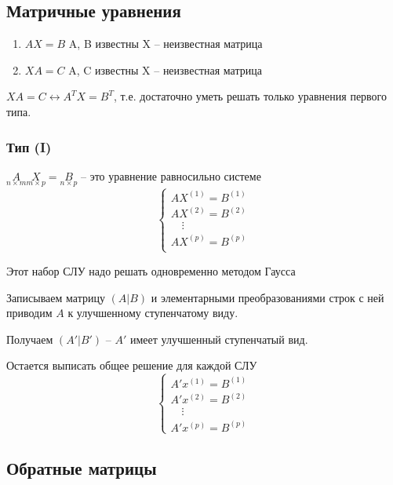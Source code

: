 \subsection{Матричные уравнения}

\begin{enumerate}
\item $AX = B$
    A, B известны
    X -- неизвестная матрица

\item $XA = C$
    A, C известны
    X -- неизвестная матрица
\end{enumerate}

$XA = C \leftrightarrow A^T X = B^T$, т.е. достаточно уметь решать только уравнения первого типа.

\subsubsection{Тип (I)}

$\underset{n \times m}{A} \underset{m \times p}{X} = \underset{n \times p}{B}$ -- это уравнение равносильно системе
\begin{equation*}
    \begin{cases}
        AX^{(1)} = B^{(1)} \\
        AX^{(2)} = B^{(2)} \\
        \quad \vdots \\
        AX^{(p)} = B^{(p)} \\
    \end{cases}
\end{equation*}

Этот набор СЛУ надо решать одновременно методом Гаусса

Записываем матрицу $(A|B)$ и элементарными преобразованиями строк с ней приводим $A$ к улучшенному ступенчатому виду.

Получаем $(A' | B')$ -- $A'$ имеет улучшенный ступенчатый вид.

Остается выписать общее решение для каждой СЛУ 
\begin{equation*}
    \begin{cases}
        A' x^{(1)} = B^{(1)} \\
        A' x^{(2)} = B^{(2)} \\
        \quad \vdots \\
        A' x^{(p)} = B^{(p)}
    \end{cases}
\end{equation*}

\subsection{Обратные матрицы}

